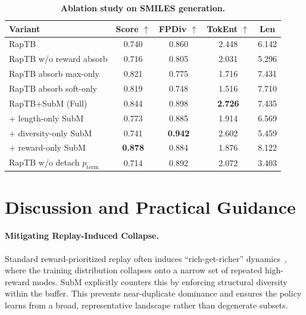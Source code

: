 \documentclass{article}
\theoremstyle{plain}
\theoremstyle{definition}
\theoremstyle{remark}
\begin{document}
\begin{table}[t]
\centering
\small
\setlength{\tabcolsep}{4pt}
\renewcommand{\arraystretch}{1.08}
\caption{\textbf{Ablation study on SMILES generation.}}
\label{tab:ablation}
\vspace{-0.4em}
\begin{tabular}{@{}lcccc@{}}
\toprule
Variant & Score $\uparrow$ & FPDiv $\uparrow$ & TokEnt $\uparrow$ & Len \\
\midrule
RapTB                               & 0.740 & 0.860 & 2.448 & 6.142 \\
\midrule
RapTB w/o reward absorb              & 0.716 & 0.805 & 2.031 & 5.296 \\
\midrule
RapTB absorb max-only                & 0.821 & 0.775 & 1.716 & 7.431 \\
RapTB absorb soft-only                & 0.819 & 0.748 & 1.516 & 7.710 \\
\midrule
RapTB+SubM (Full)                  & 0.844 & 0.898 & \textbf{2.726} & 7.435 \\
\quad + length-only SubM             & 0.773 & 0.885 & 1.914 & 6.569 \\
\quad + diversity-only SubM          & 0.741 & \textbf{0.942} & 2.602 & 5.459 \\
\quad + reward-only SubM             & \textbf{0.878} & 0.884 & 1.876 & 8.122 \\
\midrule
RapTB w/o detach $p_{\mathrm{term}}$ & 0.714 & 0.892 & 2.072 & 3.403 \\
\bottomrule
\end{tabular}
\vspace{-0.3em}
\end{table}



\section{Discussion and Practical Guidance}

\paragraph{Mitigating Replay-Induced Collapse.}
Standard reward-prioritized replay often induces ``rich-get-richer'' dynamics~\citep{pmlr-v202-shen23a}, where the training distribution collapses onto a narrow set of repeated high-reward modes. SubM explicitly counters this by enforcing structural diversity within the buffer. This prevents near-duplicate dominance and ensures the policy learns from a broad, representative landscape rather than degenerate subsets.
\end{document}
